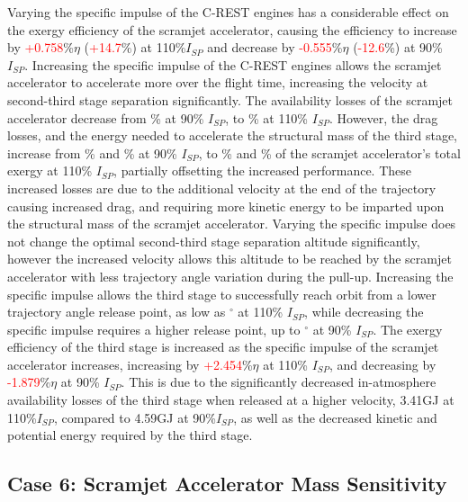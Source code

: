 Varying the specific impulse of the C-REST engines has a considerable effect on the exergy efficiency of the scramjet accelerator, causing the efficiency to increase by \textcolor{red}{+0.758}\%$\eta$ (\textcolor{red}{+14.7}\%) at 110\%$I_{SP}$ and decrease by \textcolor{red}{-0.555}\%$\eta$ (\textcolor{red}{-12.6}\%) at 90\% $I_{SP}$. 
Increasing the specific impulse of the C-REST engines allows the scramjet accelerator to accelerate more over the flight time, increasing the velocity at second-third stage separation significantly. The availability losses of the scramjet accelerator decrease from \PlosssecondIspNinetyNoReturn\% at 90\% $I_{SP}$, to \PlosssecondIspOneHundredTenNoReturn \% at 110\% $I_{SP}$. However, the drag losses, and the energy needed to accelerate the structural mass of the third stage, increase from \WDsecondIspNinetyNoReturn\% and \WsecondIspNinetyNoReturn\% at 90\% $I_{SP}$, to \WDsecondIspOneHundredTenNoReturn\% and \WsecondIspOneHundredTenNoReturn\% of the scramjet accelerator's total exergy at 110\% $I_{SP}$, partially offsetting the increased performance. These increased losses are due to the additional velocity at the end of the trajectory causing increased drag, and requiring more kinetic energy to be imparted upon the structural mass of the scramjet accelerator. 
 Varying the specific impulse does not change the optimal second-third stage separation altitude significantly, however the increased velocity allows this altitude to be reached by the scramjet accelerator with less trajectory angle variation during the pull-up. Increasing the specific impulse allows the third stage to successfully reach orbit from a lower trajectory angle release point, as low as \secondthirdSeparationgammaIspOneHundredTenNoReturn$^\circ$ at 110\% $I_{SP}$, while decreasing the specific impulse requires a higher release point, up to \secondthirdSeparationgammaIspNinetyNoReturn$^\circ$ at 90\% $I_{SP}$.
The exergy efficiency of the third stage is increased as the specific impulse of the scramjet accelerator increases, increasing by \textcolor{red}{+2.454}\%$\eta$ at 110\% $I_{SP}$, and decreasing by \textcolor{red}{-1.879}\%$\eta$ at 90\% $I_{SP}$. This is due to the significantly decreased in-atmosphere availability losses of the third stage when released at a higher velocity, 3.41GJ at 110\%$I_{SP}$, compared to 4.59GJ at 90\%$I_{SP}$, as well as the decreased kinetic and potential energy required by the third stage. 

\subsection{Case 6: Scramjet Accelerator Mass Sensitivity}\label{sec:SpartanMassnoreturn}

